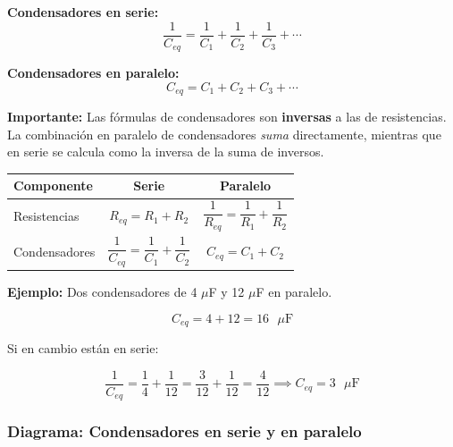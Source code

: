 \begin{seccion}
\begin{ecuacion}
\textbf{Condensadores en serie:}
$$\frac{1}{C_{eq}} = \frac{1}{C_1} + \frac{1}{C_2} + \frac{1}{C_3} + \cdots$$

\textbf{Condensadores en paralelo:}
$$C_{eq} = C_1 + C_2 + C_3 + \cdots$$
\end{ecuacion}

\begin{nota}
\textbf{Importante:} Las fórmulas de condensadores son \textbf{inversas} a las de resistencias. La combinación en paralelo de condensadores \textit{suma} directamente, mientras que en serie se calcula como la inversa de la suma de inversos.

\begin{center}
\begin{tabular}{|l|c|c|}
\hline
\rowcolor{azulmedio!20}
\textbf{Componente} & \textbf{Serie} & \textbf{Paralelo} \\
\hline
Resistencias & $R_{eq} = R_1 + R_2$ & $\dfrac{1}{R_{eq}} = \dfrac{1}{R_1} + \dfrac{1}{R_2}$ \\[6pt]
\hline
Condensadores & $\dfrac{1}{C_{eq}} = \dfrac{1}{C_1} + \dfrac{1}{C_2}$ & $C_{eq} = C_1 + C_2$ \\[6pt]
\hline
\end{tabular}
\end{center}
\end{nota}

\textbf{Ejemplo:} Dos condensadores de 4 $\mu$F y 12 $\mu$F en paralelo.

$$C_{eq} = 4 + 12 = 16 \text{ }\mu\text{F}$$

Si en cambio están en serie:

$$\frac{1}{C_{eq}} = \frac{1}{4} + \frac{1}{12} = \frac{3}{12} + \frac{1}{12} = \frac{4}{12} \implies C_{eq} = 3 \text{ }\mu\text{F}$$
\end{seccion}

\subsubsection{Diagrama: Condensadores en serie y en paralelo}

